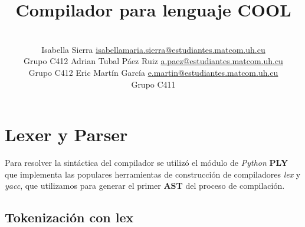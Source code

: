 \documentclass[a4paper,10pt,twocolumn]{article}
\title{Compilador para lenguaje COOL}
\author{\\
\name Isabella Sierra \email \href{mailto:isabellamaria.sierra@estudiantes.matcom.uh.cu}{isabellamaria.sierra@estudiantes.matcom.uh.cu}
	\\ \addr Grupo C412 \AND
\name Adrian Tubal Páez Ruiz \email \href{mailto:a.paez@estudiantes.matcom.uh.cu}{a.paez@estudiantes.matcom.uh.cu}
	\\ \addr Grupo C412  \AND
\name Eric Martín García \email \href{mailto:e.martin@estudiantes.matcom.uh.cu}{e.martin@estudiantes.matcom.uh.cu}
	\\ \addr Grupo C411 
 }
\begin{document}






\section{Lexer y Parser}

Para resolver la sintáctica del compilador se utilizó el módulo de \textit{Python} \textbf{PLY} que implementa las populares herramientas de construcción de compiladores \textit{lex} y \textit{yacc}, que utilizamos para generar el primer \textbf{AST} del proceso de compilación.

\subsection{Tokenización con lex}
\end{document}
